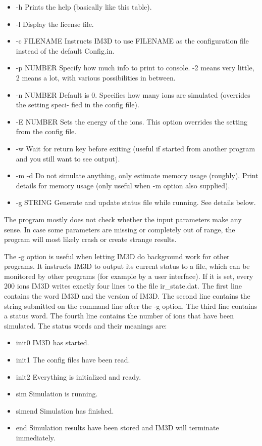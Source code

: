 \begin{itemize}
\item[] -h                       \quad Prints the help (basically like this table).
\item[] -l                        \quad Display the license file.
\item[] -c FILENAME    \quad Instructs IM3D to use FILENAME as the configuration file instead of the default Config.in.
\item[] -p NUMBER      \quad Specify how much info to print to console. -2 means very little, 2 means a lot, with various possibilities in between.
\item[] -n NUMBER      \quad Default is 0. Specifies how many ions are simulated (overrides the setting speci- fied in the config file).
\item[] -E NUMBER      \quad Sets the energy of the ions. This option overrides the setting from the config file.
\item[] -w                      \quad Wait for return key before exiting (useful if started from another program and you still want to see output).
\item[] -m -d                 \quad Do not simulate anything, only estimate memory usage (roughly). Print details for memory usage (only useful when -m option also supplied).
\item[] -g STRING        \quad Generate and update status file while running. See details below.
\end{itemize}

The program mostly does not check whether the input parameters make any sense. In case some parameters are missing or completely out of range, the program will most likely crash or create strange results.

The -g option is useful when letting IM3D do background work for other programs. It instructs IM3D to output its current status to a file, which can be monitored by other programs (for example by a user interface). If it is set, every 200 ions IM3D writes exactly four lines to the file ir{\_}state.dat. The first line contains the word IM3D and the version of IM3D. The second line contains the string submitted on the command line after the -g option. The third line contains a status word. The fourth line contains the number of ions that have been simulated. The status words and their meanings are:

\begin{itemize}
\item[] init0 \quad IM3D has started.
\item[] init1 \quad The config files have been read.
\item[] init2 \quad Everything is initialized and ready.
\item[] sim \quad Simulation is running.
\item[] simend \quad Simulation has finished.
\item[] end \quad Simulation results have been stored and IM3D will terminate immediately.
\end{itemize}

